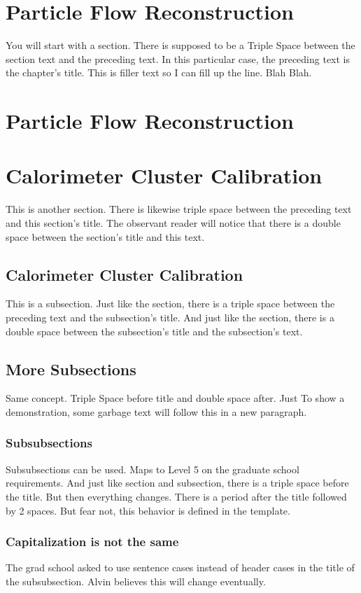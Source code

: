 \section{Particle Flow Reconstruction}
You will start with a section.
There is supposed to be a Triple Space between the section text and the preceding text.
In this particular case, the preceding text is the chapter's title.
This is filler text so I can fill up the line. Blah Blah.

\section{Particle Flow Reconstruction}
\section{Calorimeter Cluster Calibration}
This is another section.
There is likewise triple space between the preceding text and this section's title.
The observant reader will notice that there is a double space between the section's title and this text.

\subsection{Calorimeter Cluster Calibration}
This is a subsection.
Just like the section, there is a triple space between the preceding text and the subsection's title.
And just like the section, there is a double space between the subsection's title and the subsection's text.

\subsection{More Subsections}
Same concept. Triple Space before title and double space after.
Just To show a demonstration, some garbage text will follow this in a new paragraph.

\lipsum[1]

\subsubsection{Subsubsections}
Subsubsections can be used. Maps to Level 5 on the graduate school requirements.
And just like section and subsection, there is a triple space before the title.
But then everything changes.
There is a period after the title followed by 2 spaces.
But fear not, this behavior is defined in the template.

\subsubsection{Capitalization is not the same}
The grad school asked to use sentence cases instead of header cases in the title of the subsubsection.
Alvin believes this will change eventually.

